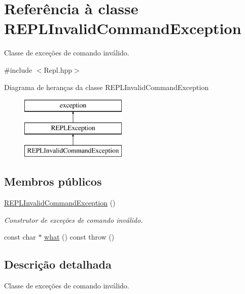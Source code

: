 \hypertarget{classREPLInvalidCommandException}{}\section{Referência à classe R\+E\+P\+L\+Invalid\+Command\+Exception}
\label{classREPLInvalidCommandException}


Classe de exceções de comando inválido.  




{\ttfamily \#include $<$Repl.\+hpp$>$}

Diagrama de heranças da classe R\+E\+P\+L\+Invalid\+Command\+Exception\begin{figure}[H]
\begin{center}
\leavevmode
\includegraphics[height=3.000000cm]{classREPLInvalidCommandException}
\end{center}
\end{figure}
\subsection*{Membros públicos}
\begin{DoxyCompactItemize}
\item 
\mbox{\label{classREPLInvalidCommandException_add845747cce364d6144985faae0ec16a}} 
\mbox{\hyperlink{classREPLInvalidCommandException_add845747cce364d6144985faae0ec16a}{R\+E\+P\+L\+Invalid\+Command\+Exception}} ()
\begin{DoxyCompactList}\small\item\em Construtor de exceções de comando inválido. \end{DoxyCompactList}\item 
const char $\ast$ \mbox{\hyperlink{classREPLInvalidCommandException_aec4c314ef19ce522dedb49c7451bafc0}{what}} () const  throw ()
\end{DoxyCompactItemize}


\subsection{Descrição detalhada}
Classe de exceções de comando inválido. 

